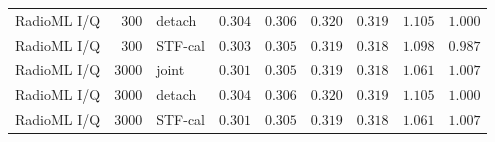 \begin{table}[t]
\begin{tabular}{lrlrrrrrr}
RadioML I/Q & 300 & detach & $0.304$ & $0.306$ & $0.320$ & $0.319$ & $1.105$ & $1.000$ \\
RadioML I/Q & 300 & STF-cal & $0.303$ & $0.305$ & $0.319$ & $0.318$ & $1.098$ & $0.987$ \\
RadioML I/Q & 3000 & joint & $0.301$ & $0.305$ & $0.319$ & $0.318$ & $1.061$ & $1.007$ \\
RadioML I/Q & 3000 & detach & $0.304$ & $0.306$ & $0.320$ & $0.319$ & $1.105$ & $1.000$ \\
RadioML I/Q & 3000 & STF-cal & $0.301$ & $0.305$ & $0.319$ & $0.318$ & $1.061$ & $1.007$ \\
\bottomrule
\end{tabular}
\end{table}
